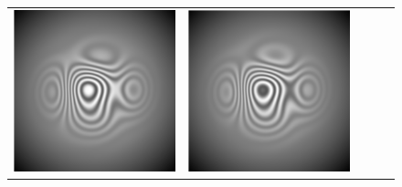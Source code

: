 \documentclass[letterpaper,12pt]{article}   %
\begin{document}
\begin{figure}[th]
\begin{center}
\begin{tabular}{ c c c c c }
			\includegraphics[scale=0.20]{figures/Interferograma3.png}}&
			\includegraphics[scale=0.20]{figures/Interferograma4.png}}&

\end{tabular}
\end{center}
\end{figure}
\end{document}
